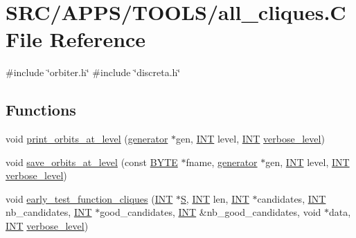 \hypertarget{all__cliques_8_c}{}\section{S\+R\+C/\+A\+P\+P\+S/\+T\+O\+O\+L\+S/all\+\_\+cliques.C File Reference}
\label{all__cliques_8_c}
{\ttfamily \#include \char`\"{}orbiter.\+h\char`\"{}}\newline
{\ttfamily \#include \char`\"{}discreta.\+h\char`\"{}}\newline
\subsection*{Functions}
\begin{DoxyCompactItemize}
\item 
void \mbox{\hyperlink{all__cliques_8_c_a0f75338604b3e69ac0915f7fcd122ec7}{print\+\_\+orbits\+\_\+at\+\_\+level}} (\mbox{\hyperlink{classgenerator}{generator}} $\ast$gen, \mbox{\hyperlink{galois_8h_a09fddde158a3a20bd2dcadb609de11dc}{I\+NT}} level, \mbox{\hyperlink{galois_8h_a09fddde158a3a20bd2dcadb609de11dc}{I\+NT}} \mbox{\hyperlink{simeon_8_c_a818073fbcc2f439e7c56952f67386122}{verbose\+\_\+level}})
\item 
void \mbox{\hyperlink{all__cliques_8_c_aba6adc5644e3eac81e1d30c31c284d40}{save\+\_\+orbits\+\_\+at\+\_\+level}} (const \mbox{\hyperlink{galois_8h_ab6cc7b4aeb6ea31aba2b3fbfc83ff5e6}{B\+Y\+TE}} $\ast$fname, \mbox{\hyperlink{classgenerator}{generator}} $\ast$gen, \mbox{\hyperlink{galois_8h_a09fddde158a3a20bd2dcadb609de11dc}{I\+NT}} level, \mbox{\hyperlink{galois_8h_a09fddde158a3a20bd2dcadb609de11dc}{I\+NT}} \mbox{\hyperlink{simeon_8_c_a818073fbcc2f439e7c56952f67386122}{verbose\+\_\+level}})
\item 
void \mbox{\hyperlink{all__cliques_8_c_a09f78bde7f687bf1bae36dd883bb182a}{early\+\_\+test\+\_\+function\+\_\+cliques}} (\mbox{\hyperlink{galois_8h_a09fddde158a3a20bd2dcadb609de11dc}{I\+NT}} $\ast$\mbox{\hyperlink{simeon_8_c_adab47f8243f1b5a2c31df2535d6b37d0}{S}}, \mbox{\hyperlink{galois_8h_a09fddde158a3a20bd2dcadb609de11dc}{I\+NT}} len, \mbox{\hyperlink{galois_8h_a09fddde158a3a20bd2dcadb609de11dc}{I\+NT}} $\ast$candidates, \mbox{\hyperlink{galois_8h_a09fddde158a3a20bd2dcadb609de11dc}{I\+NT}} nb\+\_\+candidates, \mbox{\hyperlink{galois_8h_a09fddde158a3a20bd2dcadb609de11dc}{I\+NT}} $\ast$good\+\_\+candidates, \mbox{\hyperlink{galois_8h_a09fddde158a3a20bd2dcadb609de11dc}{I\+NT}} \&nb\+\_\+good\+\_\+candidates, void $\ast$data, \mbox{\hyperlink{galois_8h_a09fddde158a3a20bd2dcadb609de11dc}{I\+NT}} \mbox{\hyperlink{simeon_8_c_a818073fbcc2f439e7c56952f67386122}{verbose\+\_\+level}})

\end{DoxyCompactItemize}
